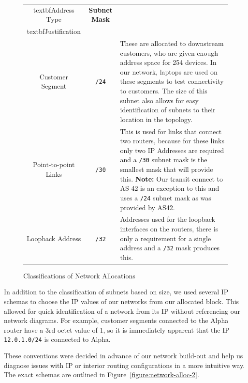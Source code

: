 \begin{figure}[!ht]     \caption{Classifications of Network Allocations}
\label{figure:network-alloc-1}     \centering
\begin{tabular}{|c|c|p{5.5cm}|}
		
		\hline textbf{Address Type} & \textbf{Subnet Mask} &
		\\textbf{Justification} \\
		
        \hline         Customer Segment & \texttt{/24} & These are allocated to
downstream customers, who are given enough address space for 254
devices. In our network, laptops are used on these segments to test
connectivity to customers. The size of this subnet also allows for easy
identification of subnets to their location in the topology.\\
		
        \hline         Point-to-point Links & \texttt{/30} & This is used for
links that         connect two routers, because for these links only two IP
Addresses are         required and a \texttt{/30} subnet mask is the smallest
mask that will         provide this. \textbf{Note:} Our transit connect to AS 42
is an         exception to this and uses a \texttt{/24} subnet mask as was
provided by AS42.\\
		
        \hline         Loopback Address & \texttt{/32} & Addresses used for the
loopback         interfaces on the routers, there is only a requirement for a
single         address and a \texttt{/32} mask produces this.\\
		
        \hline     \end{tabular} \end{figure} In addition to the classification
of subnets based on size, we used several IP schemas to choose the IP values of
our networks from our allocated block. This allowed for quick identification of
a network from its IP without referencing our network diagrams. For example,
customer segments connected to the Alpha router have a 3rd octet value of 1, so
it is immediately apparent that the IP \texttt{12.0.1.0/24} is connected to
Alpha.

These conventions were decided in advance of our network build-out and help us
diagnose issues with IP or interior routing configurations in a more intuitive
way. The exact schemas are outlined in Figure~\ref{figure:network-alloc-2}.


